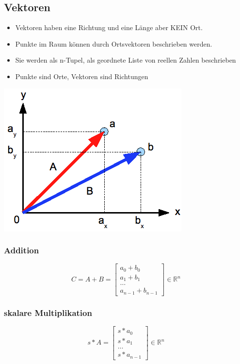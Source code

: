 \documentclass[10pt]{article}
\newcommand{\RN}{\mathbb{R}} %
\begin{document}
\subsection{Vektoren}
\begin{itemize}
	\item Vektoren haben eine Richtung und eine Länge aber KEIN Ort.
	\item Punkte im Raum können durch Ortsvektoren beschrieben werden.
	\item Sie werden als n-Tupel, als geordnete Liste von reellen Zahlen beschrieben
	\item Punkte sind Orte, Vektoren sind Richtungen
\end{itemize}
\begin{center}
	\includegraphics[scale=0.4]{vektoren.png}
\end{center}
\subsubsection{Addition}
\begin{equation}
	C=A+B=
	\begin{bmatrix}
	a_0+b_0 \\
	a_1+b_1 \\
	\dots \\
	 a_{n-1} + b_{n-1}
	\end{bmatrix}	
	\in \RN^n	
\end{equation}
\subsubsection{skalare Multiplikation}
\begin{equation}
	s*A=
	\begin{bmatrix}
	s*a_0 \\
	s*a_1 \\
	\dots \\
	s*a_{n-1}
	\end{bmatrix}
	\in \RN^n
\end{equation}
\end{document}
